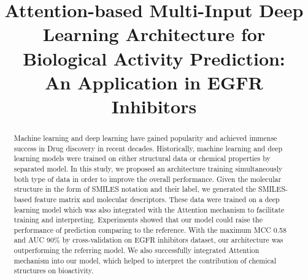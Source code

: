 \documentclass[conference]{IEEEtran}
\begin{document}
\newcommand\blfootnote[1]{\begingroup
  \renewcommand\thefootnote{}\footnote{#1}\addtocounter{footnote}{-1}\endgroup
}

\title{Attention-based Multi-Input Deep Learning Architecture for Biological Activity Prediction: \\An Application in EGFR Inhibitors
}
 
\author{
\and
{}
}



\IEEEoverridecommandlockouts
{}

\maketitle

\IEEEpubidadjcol

\begin{abstract}
Machine learning and deep learning have gained popularity and achieved immense success in Drug discovery in recent decades. Historically, machine learning and deep learning models were trained on either structural data or chemical properties by separated model. In this study, we proposed an architecture training simultaneously both type of data in order to improve the overall performance. Given the molecular structure in the form of SMILES notation and their label, we generated the SMILES-based feature matrix and molecular descriptors. These data were trained on a deep learning model which was also integrated with the Attention mechanism to facilitate training and interpreting. Experiments showed that our model could raise the performance of prediction comparing to the reference. With the maximum MCC 0.58 and AUC 90\% by cross-validation on EGFR inhibitors dataset, our architecture was outperforming the referring model. We also successfully integrated Attention mechanism into our model, which helped to interpret the contribution of chemical structures on bioactivity.
\end{abstract}
\end{document}
